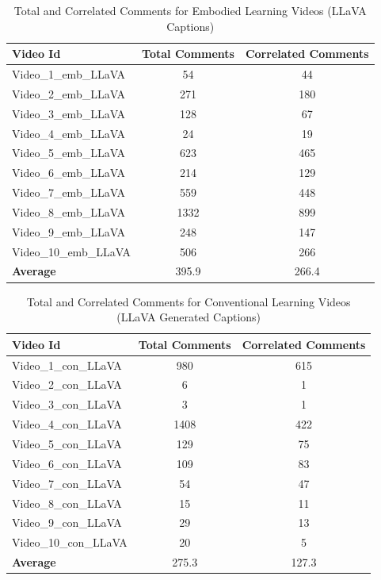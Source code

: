 \documentclass[12pt]{article}
\begin{document}
\begin{table}[H] %
    \centering
    \caption{Total and Correlated Comments for Embodied Learning Videos (LLaVA Captions)}
    \label{tab:emb_llava}
    \begin{tabular}{lcc}
        \toprule
        \textbf{Video Id} & \textbf{Total Comments} & \textbf{Correlated Comments} \\
        \midrule
        Video\_1\_emb\_LLaVA  & 54   & 44  \\
        Video\_2\_emb\_LLaVA  & 271  & 180 \\
        Video\_3\_emb\_LLaVA  & 128  & 67  \\
        Video\_4\_emb\_LLaVA  & 24   & 19  \\
        Video\_5\_emb\_LLaVA  & 623  & 465 \\
        Video\_6\_emb\_LLaVA  & 214  & 129 \\
        Video\_7\_emb\_LLaVA  & 559  & 448 \\
        Video\_8\_emb\_LLaVA  & 1332 & 899 \\
        Video\_9\_emb\_LLaVA  & 248  & 147 \\
        Video\_10\_emb\_LLaVA & 506  & 266 \\
        \textbf{Average} & 395.9 & 266.4 \\
        \bottomrule
    \end{tabular}
\end{table}




\begin{table}[H] %
    \centering
    \caption{Total and Correlated Comments for Conventional Learning Videos (LLaVA Generated Captions)}
    \label{tab:con_llava}
    \begin{tabular}{lcc}
        \toprule
        \textbf{Video Id} & \textbf{Total Comments} & \textbf{Correlated Comments} \\
        \midrule
        Video\_1\_con\_LLaVA  & 980  & 615 \\
        Video\_2\_con\_LLaVA  & 6    & 1   \\
        Video\_3\_con\_LLaVA  & 3    & 1   \\
        Video\_4\_con\_LLaVA  & 1408 & 422 \\
        Video\_5\_con\_LLaVA  & 129  & 75  \\
        Video\_6\_con\_LLaVA  & 109  & 83  \\
        Video\_7\_con\_LLaVA  & 54   & 47  \\
        Video\_8\_con\_LLaVA  & 15   & 11  \\
        Video\_9\_con\_LLaVA  & 29   & 13  \\
        Video\_10\_con\_LLaVA & 20   & 5   \\
        \textbf{Average} & 275.3 & 127.3 \\
        \bottomrule
    \end{tabular}
\end{table}
\end{document}
